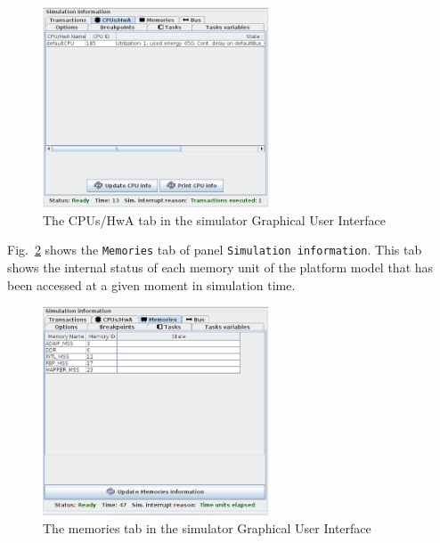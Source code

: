 \documentclass{llncs}
\begin{document}
\begin{figure}[!htbp]
	\centering
	\includegraphics[width=0.6\textwidth]{figures/screenshot/CPUHwA.png}
	\caption{The CPUs/HwA tab in the simulator Graphical User Interface}
	\label{fig:CPUHwA}
\end{figure}
%
Fig.~\ref{fig:Memories} shows the \texttt{Memories} tab of panel \texttt{Simulation information}. This tab shows the
internal status of each memory unit of the platform model that has been accessed at a given moment in simulation time.
%
\begin{figure}[!htbp]
	\centering
	\includegraphics[width=0.6\textwidth]{figures/screenshot/Memories.png}
	\caption{The memories tab in the simulator Graphical User Interface}
	\label{fig:Memories}
\end{figure}
%
\end{document}
